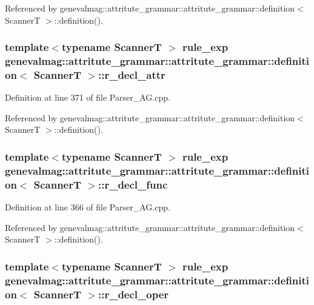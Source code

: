 Referenced by genevalmag::attritute\_\-grammar::attritute\_\-grammar::definition$<$ ScannerT $>$::definition().\hypertarget{structgenevalmag_1_1attritute__grammar_1_1definition_aef4a24ae12d4f61e15215d3b2af69b6}{
\subsubsection[{r\_\-decl\_\-attr}]{\setlength{\rightskip}{0pt plus 5cm}template$<$typename ScannerT $>$ {\bf rule\_\-exp} genevalmag::attritute\_\-grammar::attritute\_\-grammar::definition$<$ ScannerT $>$::{\bf r\_\-decl\_\-attr}}}
\label{structgenevalmag_1_1attritute__grammar_1_1definition_aef4a24ae12d4f61e15215d3b2af69b6}




Definition at line 371 of file Parser\_\-AG.cpp.

Referenced by genevalmag::attritute\_\-grammar::attritute\_\-grammar::definition$<$ ScannerT $>$::definition().\hypertarget{structgenevalmag_1_1attritute__grammar_1_1definition_4e8c4a14b734d2453dc7e169aa711fa8}{
\subsubsection[{r\_\-decl\_\-func}]{\setlength{\rightskip}{0pt plus 5cm}template$<$typename ScannerT $>$ {\bf rule\_\-exp} genevalmag::attritute\_\-grammar::attritute\_\-grammar::definition$<$ ScannerT $>$::{\bf r\_\-decl\_\-func}}}
\label{structgenevalmag_1_1attritute__grammar_1_1definition_4e8c4a14b734d2453dc7e169aa711fa8}




Definition at line 366 of file Parser\_\-AG.cpp.

Referenced by genevalmag::attritute\_\-grammar::attritute\_\-grammar::definition$<$ ScannerT $>$::definition().\hypertarget{structgenevalmag_1_1attritute__grammar_1_1definition_cd0b14169d547d97828c09ce5d9a7c17}{
\subsubsection[{r\_\-decl\_\-oper}]{\setlength{\rightskip}{0pt plus 5cm}template$<$typename ScannerT $>$ {\bf rule\_\-exp} genevalmag::attritute\_\-grammar::attritute\_\-grammar::definition$<$ ScannerT $>$::{\bf r\_\-decl\_\-oper}}}
\label{structgenevalmag_1_1attritute__grammar_1_1definition_cd0b14169d547d97828c09ce5d9a7c17}





